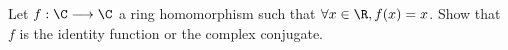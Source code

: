 Let $f : \C \longrightarrow \C$ a ring homomorphism such that $\forall x \in \R, f(x) = x$.
Show that $f$ is the identity function or the complex conjugate.